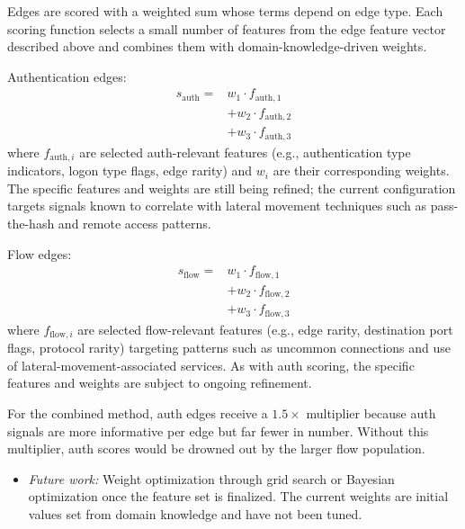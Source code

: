 Edges are scored with a weighted sum whose terms depend on edge type. Each scoring function selects a small number of features from the edge feature vector described above and combines them with domain-knowledge-driven weights.

Authentication edges:
\begin{equation}
\begin{aligned}
s_{\text{auth}} ={}& w_1 \cdot f_{\text{auth},1} \\
                   &+ w_2 \cdot f_{\text{auth},2} \\
                   &+ w_3 \cdot f_{\text{auth},3}
\end{aligned}
\end{equation}
where $f_{\text{auth},i}$ are selected auth-relevant features (e.g., authentication type indicators, logon type flags, edge rarity) and $w_i$ are their corresponding weights. The specific features and weights are still being refined; the current configuration targets signals known to correlate with lateral movement techniques such as pass-the-hash and remote access patterns.

Flow edges:
\begin{equation}
\begin{aligned}
s_{\text{flow}} ={}& w_1 \cdot f_{\text{flow},1} \\
                   &+ w_2 \cdot f_{\text{flow},2} \\
                   &+ w_3 \cdot f_{\text{flow},3}
\end{aligned}
\end{equation}
where $f_{\text{flow},i}$ are selected flow-relevant features (e.g., edge rarity, destination port flags, protocol rarity) targeting patterns such as uncommon connections and use of lateral-movement-associated services. As with auth scoring, the specific features and weights are subject to ongoing refinement.

For the combined method, auth edges receive a $1.5\times$ multiplier because auth signals are more informative per edge but far fewer in number. Without this multiplier, auth scores would be drowned out by the larger flow population.

\begin{itemize}
\item \textit{Future work:} Weight optimization through grid search or Bayesian optimization once the feature set is finalized. The current weights are initial values set from domain knowledge and have not been tuned.
\end{itemize}

